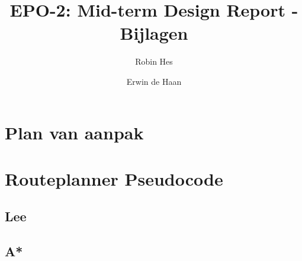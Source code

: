 \documentclass{report}
\title{EPO-2: Mid-term Design Report - Bijlagen}
\author{Robin Hes \and Erwin de Haan}
\begin{document}
\renewcommand{\chapternumber}{\appendixname\;\thechapter}
\begin{appendices}

\chapter{Plan van aanpak}
\label{app:pva}



\chapter{Routeplanner Pseudocode}
\label{app:pseudocode}

\section{Lee}
\label{appsec:pseudocode-lee}
\section{A*}
\label{appsec:pseudocode-astar}


\newpage

\end{appendices}
\end{document}
